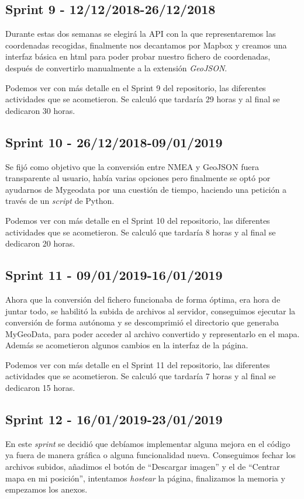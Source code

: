 \subsection{Sprint 9 - 12/12/2018-26/12/2018}
Durante estas dos semanas se elegirá la API con la que representaremos las coordenadas recogidas, finalmente nos decantamos por Mapbox y creamos una interfaz básica en html para poder probar nuestro fichero de coordenadas, después de convertirlo manualmente a la extensión \textit{GeoJSON}.

Podemos ver con más detalle en el Sprint 9 del repositorio, las diferentes actividades que se acometieron. 
Se calculó que tardaría 29 horas y al final se dedicaron 30 horas.

\subsection{Sprint 10 - 26/12/2018-09/01/2019}
Se fijó como objetivo que la conversión entre NMEA y GeoJSON fuera transparente al usuario, había varias opciones pero finalmente se optó por ayudarnos de Mygeodata por una cuestión de tiempo, haciendo una petición a través de un \textit{script} de Python.

Podemos ver con más detalle en el Sprint 10 del repositorio, las diferentes actividades que se acometieron. 
Se calculó que tardaría 8 horas y al final se dedicaron 20 horas. 

\subsection{Sprint 11 - 09/01/2019-16/01/2019}
Ahora que la conversión del fichero funcionaba de forma óptima, era hora de juntar todo, se habilitó la subida de archivos al servidor, conseguimos ejecutar la conversión de forma autónoma y se descomprimió el directorio que generaba MyGeoData, para poder acceder al archivo convertido y representarlo en el mapa. Además se acometieron algunos cambios en la interfaz de la página.

Podemos ver con más detalle en el Sprint 11 del repositorio, las diferentes actividades que se acometieron. 
Se calculó que tardaría 7 horas y al final se dedicaron 15 horas.

\subsection{Sprint 12 - 16/01/2019-23/01/2019}
En este \textit{sprint} se decidió que debíamos implementar alguna mejora en el código ya fuera de manera gráfica o alguna funcionalidad nueva. Conseguimos fechar los archivos subidos, añadimos el botón de ``Descargar imagen'' y el de ``Centrar mapa en mi posición'', intentamos \textit{hostear} la página, finalizamos la memoria y empezamos los anexos.

